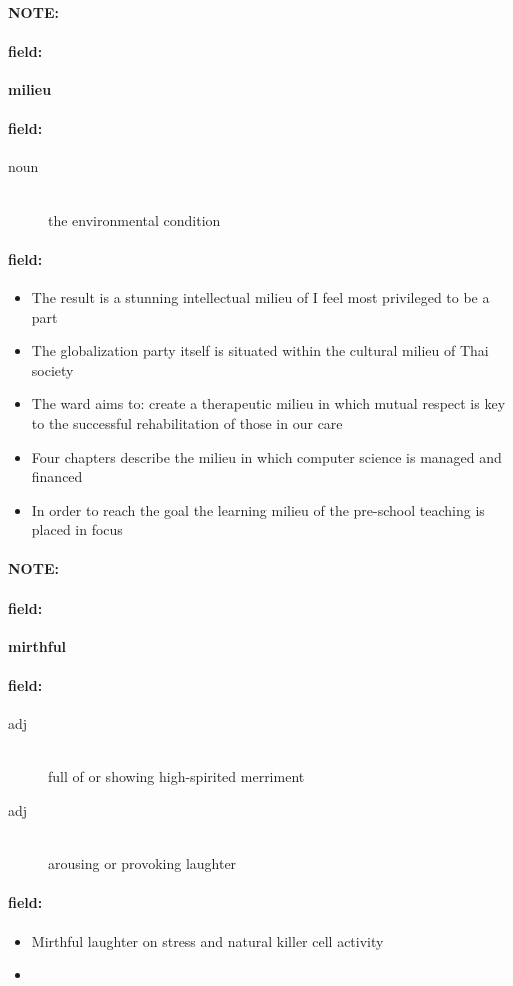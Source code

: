 \documentclass[12pt]{article}
\newenvironment{note}{\paragraph{NOTE:}}{}
\newenvironment{field}{\paragraph{field:}}{}
\begin{document}
\begin{note}
\begin{field}
\textbf{\large milieu}
\end{field}


\begin{field}
\begin{description}
\item[noun] \hfill \\ 
the environmental condition

\end{description}
\end{field}

\begin{field}
\begin{itemize}
\item The result is a stunning intellectual milieu of I feel most privileged to be a part
\item The globalization party itself is situated within the cultural milieu of Thai society
\item The ward aims to: create a therapeutic milieu in which mutual respect is key to the successful rehabilitation of those in our care
\item Four chapters describe the milieu in which computer science is managed and financed
\item In order to reach the goal the learning milieu of the pre-school teaching is placed in focus
\end{itemize}
\end{field}
\end{note}
\begin{note}
\begin{field}
\textbf{\large mirthful}
\end{field}


\begin{field}
\begin{description}
\item[adj] \hfill \\ 
full of or showing high-spirited merriment

\item[adj] \hfill \\ 
arousing or provoking laughter

\end{description}
\end{field}

\begin{field}
\begin{itemize}
\item Mirthful laughter on stress and natural killer cell activity
\item 
\end{itemize}
\end{field}
\end{note}
\end{document}
